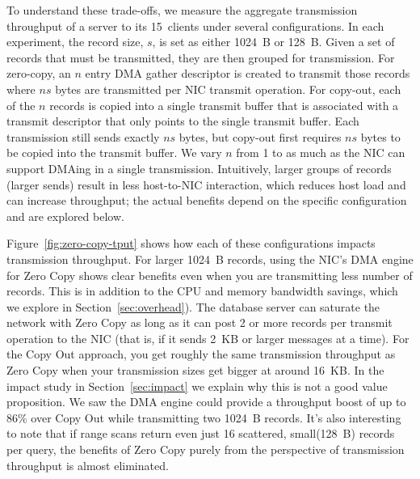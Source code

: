 To understand these trade-offs, we measure the aggregate transmission
throughput of a server to its 15~clients under several
configurations.  In each experiment, the record size, $s$, is set as either 1024~B or
128~B. Given a set of records that must be transmitted, they are then grouped
for transmission. For zero-copy, an $n$ entry DMA gather descriptor is created
to transmit those records where $ns$ bytes are transmitted per NIC transmit
operation. For copy-out, each of the $n$ records is copied into a single
transmit buffer that is associated with a transmit descriptor that only points
to the single transmit buffer. Each transmission still sends exactly $ns$
bytes, but copy-out first requires $ns$ bytes to be copied into the transmit buffer.
We vary $n$ from 1 to as much as the NIC can support DMAing in a single transmission.
Intuitively, larger groups of records (larger sends) result in less host-to-NIC
interaction, which reduces host load and can increase throughput; the actual benefits
depend on the specific configuration and are explored below.

Figure~\ref{fig:zero-copy-tput} shows how each of these configurations impacts
transmission throughput. For larger 1024~B records, using the NIC's DMA engine
for Zero Copy shows clear benefits even when you are transmitting less number of 
records. This is in addition to the CPU and memory bandwidth savings, which 
we explore in Section~\ref{sec:overhead}). The database server can 
saturate the network with Zero Copy as long as it can post 2 or more
records per transmit operation to the NIC (that is, if it sends 2~KB or larger
messages at a time). For the Copy Out approach, you get roughly the same transmission 
throughput as Zero Copy when your transmission sizes get bigger at around 16~KB. In 
the impact study in Section~\ref{sec:impact} we explain why this is not a good value 
proposition. We saw the DMA engine could provide a throughput boost
of up to 86\% over Copy Out while transmitting two 1024~B records. It's also interesting 
to note that if range scans return even just 16 scattered, small(128~B) records per query, the
benefits of Zero Copy purely from the perspective of transmission throughput is almost eliminated.





